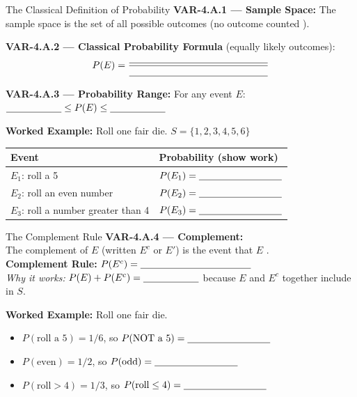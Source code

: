 \documentclass[10pt]{article}
\begin{document}
\begin{notesbox}{The Classical Definition of Probability}
\small
\textbf{VAR-4.A.1 --- Sample Space:} The sample space is the set of all possible
\blank{4cm} outcomes (no outcome counted \blank{3cm}).

\vspace{8pt}
\textbf{VAR-4.A.2 --- Classical Probability Formula} (equally likely outcomes):
\[
  P(E) = \frac{\blank{5cm}}{\blank{5cm}}
\]

\vspace{6pt}
\textbf{VAR-4.A.3 --- Probability Range:} For any event $E$:
$\blank{2cm} \le P(E) \le \blank{2cm}$

\vspace{10pt}
\textbf{Worked Example:} Roll one fair die. $S = \{1, 2, 3, 4, 5, 6\}$
\vspace{4pt}
\renewcommand{\arraystretch}{1.6}
\begin{tabularx}{\linewidth}{@{} l X @{}}
Event & Probability (show work) \\
\hline
$E_1$: roll a 5 & $P(E_1) = \blank{3cm}$ \\
$E_2$: roll an even number & $P(E_2) = \blank{3cm}$ \\
$E_3$: roll a number greater than 4 & $P(E_3) = \blank{3cm}$ \\
\end{tabularx}
\end{notesbox}

\vspace{0.1in}

\begin{notesbox}{The Complement Rule}
\small
\textbf{VAR-4.A.4 --- Complement:}\\
The complement of $E$ (written $E^c$ or $E'$) is the event that $E$ \blank{3cm}.\\[6pt]
\textbf{Complement Rule:} $P(E^c) = \blank{4cm}$\\[6pt]
\textit{Why it works:} $P(E) + P(E^c) = \blank{2cm}$ because $E$ and $E^c$ together
include \blank{5cm} in $S$.

\vspace{10pt}
\textbf{Worked Example:} Roll one fair die.
\begin{itemize}[itemsep=4pt]
  \item $P(\text{roll a 5}) = 1/6$, so $P(\text{NOT a 5}) = \blank{3cm}$
  \item $P(\text{even}) = 1/2$, so $P(\text{odd}) = \blank{3cm}$
  \item $P(\text{roll} > 4) = 1/3$, so $P(\text{roll} \le 4) = \blank{3cm}$
\end{itemize}
\end{notesbox}
\end{document}
